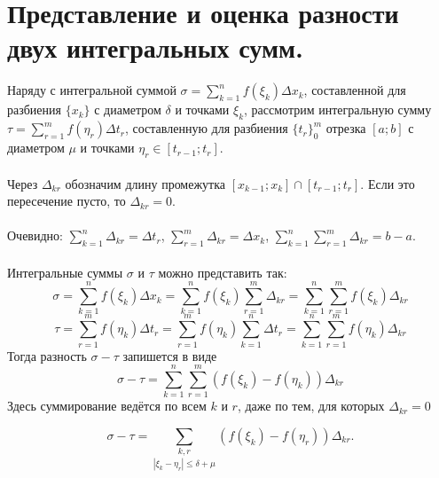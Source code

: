 \section{Представление и оценка разности двух интегральных сумм.}
Наряду с интегральной суммой $\sigma = \sum\limits_{k=1}^{n}f(\xi_k)\Delta x_k$, составленной для разбиения $\{x_k\}$ с диаметром $\delta$ и точками $\xi_k$, рассмотрим интегральную сумму $\tau = \sum\limits_{r=1}^{m}f(\eta_r)\Delta t_r$, составленную для разбиения ${\{t_r\}}^m_0$ отрезка $[a;b]$ с диаметром $\mu$ и точками $\eta_r \in [t_{r - 1}; t_r]$.\\\\
Через $\Delta_{kr}$ обозначим длину промежутка $[x_{k - 1}; x_k] \cap [t_{r - 1}; t_r]$. Если это пересечение пусто, то $\Delta_{kr} = 0$.\\\\
Очевидно: $\sum\limits_{k=1}^{n}\Delta_{kr} = \Delta t_r$,  $\sum\limits_{r=1}^{m}\Delta_{kr} = \Delta x_k$,  $\sum\limits_{k=1}^{n} \sum\limits_{r=1}^{m} \Delta_{kr} = b - a$.\\\\
Интегральные суммы $\sigma$ и $\tau$ можно представить так:
$$\sigma = \sum_{k=1}^{n}f(\xi_k)\Delta x_k = \sum_{k=1}^{n}f(\xi_k) \sum_{r=1}^{m} \Delta_{kr} = \sum_{k=1}^{n} \sum_{r=1}^{m} f(\xi_k) \Delta_{kr}  $$
$$\tau = \sum_{r=1}^{m}f(\eta_k)\Delta t_r = \sum_{r=1}^{m}f(\eta_k) \sum_{k=1}^{n} \Delta t_r = \sum_{k=1}^{n} \sum_{r=1}^{m} f(\eta_k) \Delta_{kr}  $$
Тогда разность $\sigma - \tau$  запишется в виде
$$\sigma - \tau = \sum_{k=1}^{n} \sum_{r=1}^{m}(f(\xi_k) - f(\eta_k))\Delta_{kr} $$
Здесь суммирование ведётся по всем $k$ и $r$, даже по тем, для которых $\Delta_{kr} = 0$
\begin{lemma}
	$$\sigma - \tau = \underset{|\xi_k - \eta_r| \le \delta + \mu}{\sum_{k, r}}(f(\xi_k) - f(\eta_r))\Delta_{kr}.$$
\end{lemma}
